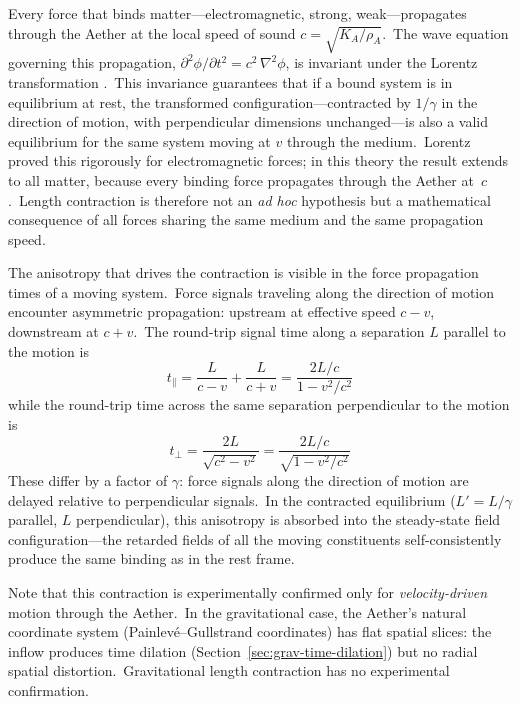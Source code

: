 ﻿\documentclass[12pt,letterpaper]{article}
\newcommand{\rhoa}{\rho_{\!A}}
\newcommand{\Ka}{K_{\!A}}
\begin{document}
Every force that binds matter---electromagnetic, strong, weak---propagates
through the Aether at the local speed of sound $c = \sqrt{\Ka/\rhoa}$.\ The
wave equation governing this propagation,
$\partial^2\phi/\partial t^2 = c^2\,\nabla^2\phi$, is invariant under the
Lorentz transformation \cite{lorentz1904}.\ This invariance guarantees that
if a bound system is in equilibrium at rest, the transformed
configuration---contracted by $1/\gamma$ in the direction of motion, with
perpendicular dimensions unchanged---is also a valid equilibrium for the same
system moving at $v$ through the medium.\ Lorentz \cite{lorentz1904} proved
this rigorously for electromagnetic forces; in this theory the result extends
to all matter, because every binding force propagates through the Aether
at~$c$.\ Length contraction is therefore not an \textit{ad hoc}
hypothesis but a mathematical consequence of all forces sharing the same
medium and the same propagation speed.

The anisotropy that drives the contraction is visible in the force propagation
times of a moving system.\ Force signals traveling along the direction of motion
encounter asymmetric propagation: upstream at effective speed $c - v$,
downstream at $c + v$.\ The round-trip signal time along a separation $L$
parallel to the motion is
%
\begin{equation}
  t_{\parallel} = \frac{L}{c - v} + \frac{L}{c + v}
    = \frac{2L/c}{1 - v^2/c^2}
\end{equation}
%
while the round-trip time across the same separation perpendicular to the
motion is
%
\begin{equation}
  t_{\perp} = \frac{2L}{\sqrt{c^2 - v^2}}
    = \frac{2L/c}{\sqrt{1 - v^2/c^2}}
\end{equation}
%
These differ by a factor of $\gamma$: force signals along the direction of
motion are delayed relative to perpendicular signals.\ In the contracted
equilibrium ($L' = L/\gamma$ parallel, $L$ perpendicular), this anisotropy is
absorbed into the steady-state field configuration---the retarded fields of
all the moving constituents self-consistently produce the same binding as in
the rest frame.

Note that this contraction is experimentally confirmed only for
\emph{velocity-driven} motion through the Aether.\ In the gravitational case,
the Aether's natural coordinate system (Painlev\'{e}--Gullstrand coordinates)
has flat spatial slices: the inflow produces time dilation
(Section~\ref{sec:grav-time-dilation}) but no radial spatial distortion.\
Gravitational length contraction has no experimental confirmation.
\end{document}
